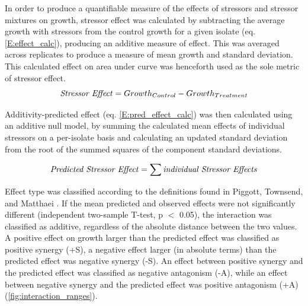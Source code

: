 \documentclass[final,1p,times]{elsarticle}
\begin{document}
In order to produce a quantifiable measure of the effects of stressors and stressor mixtures on growth, stressor effect was calculated by subtracting the average growth with stressors from the control growth for a given isolate (eq. \ref{E:effect_calc}), producing an additive measure of effect. This was averaged across replicates to produce a measure of mean growth and standard deviation. This calculated effect on area under curve was henceforth used as the sole metric of stressor effect.
\begin{equation}
\text{\textit{Stressor Effect}} = Growth_{Control} - Growth_{Treatment}
\label{E:effect_calc}
\end{equation}

Additivity-predicted effect (eq. \ref{E:pred_effect_calc}) was then calculated using an additive null model, by summing the calculated mean effects of individual stressors on a per-isolate basis and calculating an updated standard deviation from the root of the summed squares of the component standard deviations.

\begin{equation}
\text{\textit{Predicted Stressor Effect}} = \sum \text{\textit{individual Stressor Effects}}
\label{E:pred_effect_calc}
\end{equation}

Effect type was classified according to the definitions found in Piggott, Townsend, and Matthaei \cite{Piggott2015}. If the mean predicted and observed effects were not significantly different (independent two-sample T-test, p $<$ 0.05), the interaction was classified as additive, regardless of the absolute distance between the two values. A positive effect on growth larger than the predicted effect was classified as positive synergy (+S), a negative effect larger (in absolute terms) than the predicted effect was negative synergy (-S). An effect between positive synergy and the predicted effect was classified as negative antagonism (-A), while an effect between negative synergy and the predicted effect was positive antagonism (+A) (\cref{fig:interaction_ranges}). 
\end{document}
